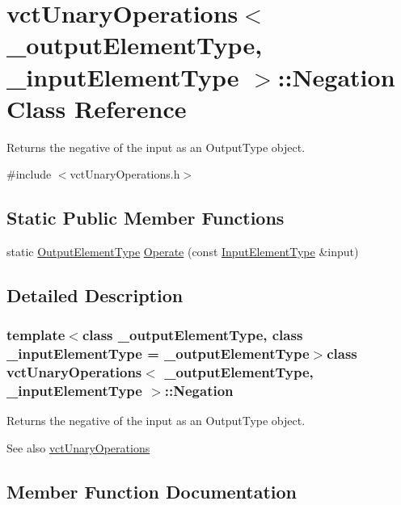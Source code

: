 \hypertarget{classvct_unary_operations_1_1_negation}{}\section{vct\+Unary\+Operations$<$ \+\_\+output\+Element\+Type, \+\_\+input\+Element\+Type $>$\+:\+:Negation Class Reference}
\label{classvct_unary_operations_1_1_negation}


Returns the negative of the input as an Output\+Type object.  




{\ttfamily \#include $<$vct\+Unary\+Operations.\+h$>$}

\subsection*{Static Public Member Functions}
\begin{DoxyCompactItemize}
\item 
static \hyperlink{classvct_unary_operations_a42306ac3dd20d32c6d6c66ac3fa2e7b9}{Output\+Element\+Type} \hyperlink{classvct_unary_operations_1_1_negation_a747ce0a6ddba1d2a8955955f6d0ab891}{Operate} (const \hyperlink{classvct_unary_operations_abf3b77bb7b8abd7ba72a6a45a65696a7}{Input\+Element\+Type} \&input)
\end{DoxyCompactItemize}


\subsection{Detailed Description}
\subsubsection*{template$<$class \+\_\+output\+Element\+Type, class \+\_\+input\+Element\+Type = \+\_\+output\+Element\+Type$>$class vct\+Unary\+Operations$<$ \+\_\+output\+Element\+Type, \+\_\+input\+Element\+Type $>$\+::\+Negation}

Returns the negative of the input as an Output\+Type object. 

\begin{DoxySeeAlso}{See also}
\hyperlink{classvct_unary_operations}{vct\+Unary\+Operations} 
\end{DoxySeeAlso}


\subsection{Member Function Documentation}
\hypertarget{classvct_unary_operations_1_1_negation_a747ce0a6ddba1d2a8955955f6d0ab891}{}
